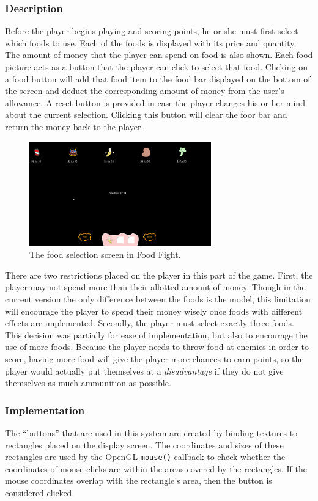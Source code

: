 \documentclass{article}
\begin{document}
\subsubsection{Description}
Before the player begins playing and scoring points, he or she must first select which foods to use. Each of the foods is displayed with its price and quantity. The amount of money that the player can spend on food is also shown. Each food picture acts as a button that the player can click to select that food. Clicking on a food button will add that food item to the food bar displayed on the bottom of the screen and deduct the corresponding amount of money from the user's allowance. A reset button is provided in case the player changes his or her mind about the current selection. Clicking this button will clear the foor bar and return the money back to the player. 

\begin{figure}[H]
  \centering
    \includegraphics[width=0.7\textwidth]{foodselect}
      \caption{The food selection screen in Food Fight.}
\end{figure}

There are two restrictions placed on the player in this part of the game. First, the player may not spend more than their allotted amount of money. Though in the current version the only difference between the foods is the model, this limitation will encourage the player to spend their money wisely once foods with different effects are implemented. Secondly, the player must select exactly three foods. This decision was partially for ease of implementation, but also to encourage the use of more foods. Because the player needs to throw food at enemies in order to score, having more food will give the player more chances to earn points, so the player would actually put themselves at a \textit{disadvantage} if they do not give themselves as much ammunition as possible.

\subsubsection{Implementation}
The ``buttons'' that are used in this system are created by binding textures to rectangles placed on the display screen. The coordinates and sizes of these rectangles are used by the OpenGL \verb+mouse()+ callback to check whether the coordinates of mouse clicks are within the areas covered by the rectangles. If the mouse coordinates overlap with the rectangle's area, then the button is considered clicked.
\end{document}
